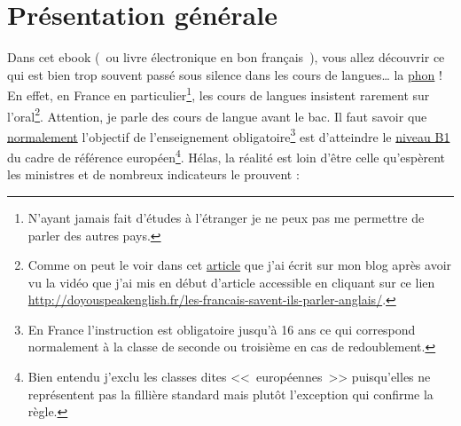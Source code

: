 \section{Présentation générale}\label{sec:pres}
Dans cet ebook (~ou livre électronique en bon français~), vous allez
découvrir ce qui est bien trop souvent passé sous silence dans les
cours de langues\ldots{} la \underline{\gls{phon}} ! En effet, en France en
particulier\footnote{N'ayant jamais fait d'études à l'étranger je ne
  peux pas me permettre de parler des autres pays.}, les cours de
langues insistent rarement sur l'oral\footnote{Comme on peut le voir
  dans cet
  \href{http://doyouspeakenglish.fr/les-francais-savent-ils-parler-anglais/}{article}
  que j'ai écrit sur mon blog après avoir vu la vidéo que j'ai mis en
  début d'article accessible en cliquant sur ce lien 
  \url{http://doyouspeakenglish.fr/les-francais-savent-ils-parler-anglais/}.}. Attention, je parle des cours
de langue avant le bac. Il faut savoir que \underline{normalement}
l'objectif de l'enseignement obligatoire\footnote{En France
  l'instruction est obligatoire jusqu'à 16 ans ce qui correspond
  normalement à la classe de seconde ou troisième en cas de
  redoublement.} est d'atteindre le
\href{http://doyouspeakenglish.fr/quel-niveau-danglais-avez-vous/}{niveau
  B1} du cadre de référence européen\footnote{Bien entendu j'exclu les
classes dites <<~européennes~>> puisqu'elles ne représentent pas la
fillière standard mais plutôt l'exception qui confirme la règle.}. Hélas, la réalité est
loin d'être celle qu'espèrent les ministres et de nombreux indicateurs le prouvent :
